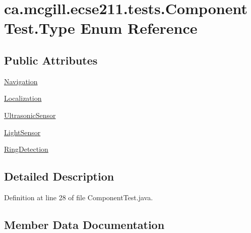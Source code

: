 \hypertarget{enumca_1_1mcgill_1_1ecse211_1_1tests_1_1_component_test_1_1_type}{}\section{ca.\+mcgill.\+ecse211.\+tests.\+Component\+Test.\+Type Enum Reference}
\label{enumca_1_1mcgill_1_1ecse211_1_1tests_1_1_component_test_1_1_type}
\subsection*{Public Attributes}
\begin{DoxyCompactItemize}
\item 
\hyperlink{enumca_1_1mcgill_1_1ecse211_1_1tests_1_1_component_test_1_1_type_a70ec62ab2b745dd99e291459279910ea}{Navigation}
\item 
\hyperlink{enumca_1_1mcgill_1_1ecse211_1_1tests_1_1_component_test_1_1_type_acdc93de9366f2e6710c7f2fc0e4478c3}{Localization}
\item 
\hyperlink{enumca_1_1mcgill_1_1ecse211_1_1tests_1_1_component_test_1_1_type_acb88d74b8bd35b190f8b1b05730c213a}{Ultrasonic\+Sensor}
\item 
\hyperlink{enumca_1_1mcgill_1_1ecse211_1_1tests_1_1_component_test_1_1_type_aa8c9262ad5014cd52ecce2eec6604510}{Light\+Sensor}
\item 
\hyperlink{enumca_1_1mcgill_1_1ecse211_1_1tests_1_1_component_test_1_1_type_ab118eac94e0b37e6871a4c9a788c675e}{Ring\+Detection}
\end{DoxyCompactItemize}


\subsection{Detailed Description}


Definition at line 28 of file Component\+Test.\+java.



\subsection{Member Data Documentation}
\mbox{\label{enumca_1_1mcgill_1_1ecse211_1_1tests_1_1_component_test_1_1_type_aa8c9262ad5014cd52ecce2eec6604510}} 
